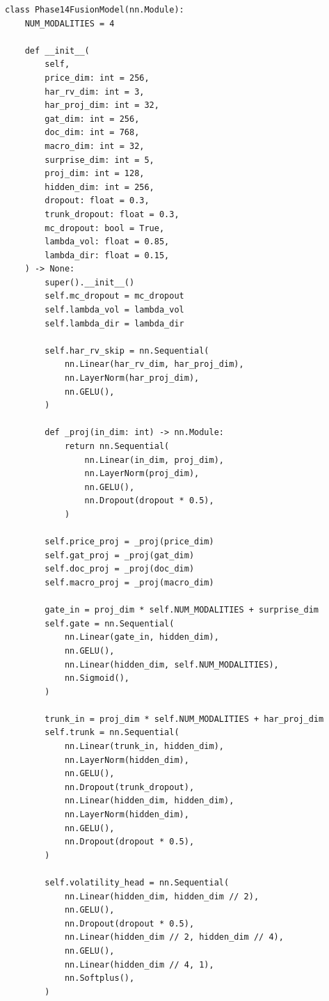 \documentclass[12pt,a4paper]{article}
\begin{document}
\begin{lstlisting}[caption={Phase 14 Fusion Model with HAR-RV skip (src/models/fusion\_model.py)}]
class Phase14FusionModel(nn.Module):
    NUM_MODALITIES = 4

    def __init__(
        self,
        price_dim: int = 256,
        har_rv_dim: int = 3,
        har_proj_dim: int = 32,
        gat_dim: int = 256,
        doc_dim: int = 768,
        macro_dim: int = 32,
        surprise_dim: int = 5,
        proj_dim: int = 128,
        hidden_dim: int = 256,
        dropout: float = 0.3,
        trunk_dropout: float = 0.3,
        mc_dropout: bool = True,
        lambda_vol: float = 0.85,
        lambda_dir: float = 0.15,
    ) -> None:
        super().__init__()
        self.mc_dropout = mc_dropout
        self.lambda_vol = lambda_vol
        self.lambda_dir = lambda_dir

        self.har_rv_skip = nn.Sequential(
            nn.Linear(har_rv_dim, har_proj_dim),
            nn.LayerNorm(har_proj_dim),
            nn.GELU(),
        )

        def _proj(in_dim: int) -> nn.Module:
            return nn.Sequential(
                nn.Linear(in_dim, proj_dim),
                nn.LayerNorm(proj_dim),
                nn.GELU(),
                nn.Dropout(dropout * 0.5),
            )

        self.price_proj = _proj(price_dim)
        self.gat_proj = _proj(gat_dim)
        self.doc_proj = _proj(doc_dim)
        self.macro_proj = _proj(macro_dim)

        gate_in = proj_dim * self.NUM_MODALITIES + surprise_dim
        self.gate = nn.Sequential(
            nn.Linear(gate_in, hidden_dim),
            nn.GELU(),
            nn.Linear(hidden_dim, self.NUM_MODALITIES),
            nn.Sigmoid(),
        )

        trunk_in = proj_dim * self.NUM_MODALITIES + har_proj_dim
        self.trunk = nn.Sequential(
            nn.Linear(trunk_in, hidden_dim),
            nn.LayerNorm(hidden_dim),
            nn.GELU(),
            nn.Dropout(trunk_dropout),
            nn.Linear(hidden_dim, hidden_dim),
            nn.LayerNorm(hidden_dim),
            nn.GELU(),
            nn.Dropout(dropout * 0.5),
        )

        self.volatility_head = nn.Sequential(
            nn.Linear(hidden_dim, hidden_dim // 2),
            nn.GELU(),
            nn.Dropout(dropout * 0.5),
            nn.Linear(hidden_dim // 2, hidden_dim // 4),
            nn.GELU(),
            nn.Linear(hidden_dim // 4, 1),
            nn.Softplus(),
        )


\end{lstlisting}
\end{document}
